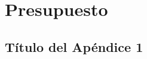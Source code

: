 \documentclass[spanish,a4paper,14pt,oneside]{extreport}
\begin{document}


\newpage{\pagestyle{empty}}
\thispagestyle{empty}

\chapter{Presupuesto}
\label{chapter:Presupuesto}




\newpage{\pagestyle{empty}}
\thispagestyle{empty}
\begin{appendix}

\chapter{Título del Apéndice 1}
\label{appendix:1}


\end{appendix}




\nocite{*}

\end{document}
